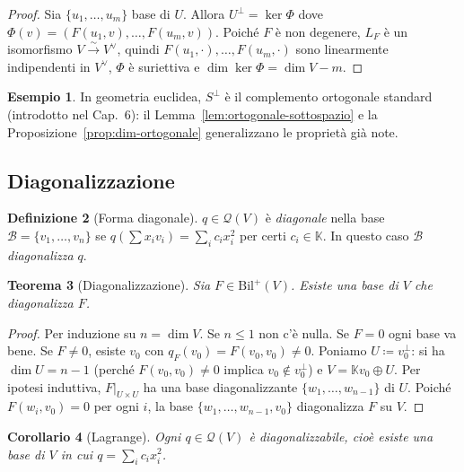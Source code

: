 \documentclass[11pt, a4paper]{book}
\theoremstyle{definition}
\newtheorem{definizione}{Definizione}[section]
\newtheorem{esempio}[definizione]{Esempio}
\theoremstyle{plain}
\newtheorem{teorema}[definizione]{Teorema}
\newtheorem{corollario}[definizione]{Corollario}
\theoremstyle{remark}
\newcommand{\K}{\mathbb{K}}
\begin{document}
\begin{proof}
Sia $\{u_1,\ldots,u_m\}$ base di $U$. Allora $U^\perp = \ker\Phi$ dove $\Phi(v) = (F(u_1,v),\ldots,F(u_m,v))$. Poiché $F$ è non degenere, $L_F$ è un isomorfismo $V \xrightarrow{\sim} V^\vee$, quindi $F(u_1,\cdot),\ldots,F(u_m,\cdot)$ sono linearmente indipendenti in $V^\vee$, $\Phi$ è suriettiva e $\dim\ker\Phi = \dim V - m$.
\end{proof}

\begin{exbox}
\begin{esempio}
In geometria euclidea, $S^\perp$ è il complemento ortogonale standard (introdotto nel Cap.~6): il Lemma~\ref{lem:ortogonale-sottospazio} e la Proposizione~\ref{prop:dim-ortogonale} generalizzano le proprietà già note.
\end{esempio}
\end{exbox}

\subsection{Diagonalizzazione}

\begin{defbox}
\begin{definizione}[Forma diagonale]
$q \in \mathcal{Q}(V)$ è \emph{diagonale} nella base $\mathcal{B} = \{v_1,\ldots,v_n\}$ se $q({\textstyle\sum} x_iv_i) = \sum_i c_i x_i^2$ per certi $c_i \in \K$. In questo caso $\mathcal{B}$ \emph{diagonalizza} $q$.
\end{definizione}
\end{defbox}

\begin{teorema}[Diagonalizzazione]
\label{thm:diagonalizzazione}
Sia $F \in \mathrm{Bil}^+(V)$. Esiste una base di $V$ che diagonalizza $F$.
\end{teorema}

\begin{proof}
Per induzione su $n = \dim V$. Se $n \le 1$ non c'è nulla. Se $F = 0$ ogni base va bene. Se $F \neq 0$, esiste $v_0$ con $q_F(v_0) = F(v_0,v_0) \neq 0$. Poniamo $U \coloneqq v_0^\perp$: si ha $\dim U = n-1$ (perché $F(v_0,v_0) \neq 0$ implica $v_0 \notin v_0^\perp$) e $V = \K v_0 \oplus U$. Per ipotesi induttiva, $F|_{U\times U}$ ha una base diagonalizzante $\{w_1,\ldots,w_{n-1}\}$ di $U$. Poiché $F(w_i,v_0) = 0$ per ogni $i$, la base $\{w_1,\ldots,w_{n-1},v_0\}$ diagonalizza $F$ su $V$.
\end{proof}

\begin{corollario}[Lagrange]
\label{cor:lagrange}
Ogni $q \in \mathcal{Q}(V)$ è diagonalizzabile, cioè esiste una base di $V$ in cui $q = \sum_i c_i x_i^2$.
\end{corollario}
\end{document}
